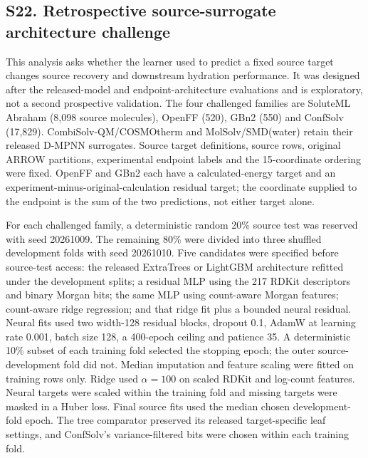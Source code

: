 \subsection*{S22. Retrospective source-surrogate architecture challenge}

This analysis asks whether the learner used to predict a fixed source target
changes source recovery and downstream hydration performance. It was designed
after the released-model and endpoint-architecture evaluations and is
exploratory, not a second prospective validation. The four challenged families
are SoluteML Abraham (8,098 source molecules), OpenFF (520), GBn2 (550) and
ConfSolv (17,829). CombiSolv-QM/COSMOtherm and MolSolv/SMD(water) retain their
released D-MPNN surrogates. Source target definitions, source rows, original
ARROW partitions, experimental endpoint labels and the 15-coordinate ordering
were fixed. OpenFF and GBn2 each have a calculated-energy target and an
experiment-minus-original-calculation residual target; the coordinate supplied
to the endpoint is the sum of the two predictions, not either target alone.

For each challenged family, a deterministic random 20\% source test was reserved
with seed 20261009. The remaining 80\% were divided into three shuffled
development folds with seed 20261010. Five candidates were specified before
source-test access: the released ExtraTrees or LightGBM architecture refitted
under the development splits; a residual MLP using the 217 RDKit descriptors
and binary Morgan bits; the same MLP using count-aware Morgan features;
count-aware ridge regression; and that ridge fit plus a bounded neural residual.
Neural fits used two width-128 residual blocks, dropout 0.1, AdamW at learning
rate 0.001, batch size 128, a 400-epoch ceiling and patience 35. A deterministic
10\% subset of each training fold selected the stopping epoch; the outer
source-development fold did not. Median imputation and feature scaling were
fitted on training rows only. Ridge used $\alpha=100$ on scaled RDKit and
log-count features. Neural targets were scaled within the training fold and
missing targets were masked in a Huber loss. Final source fits used the median
chosen development-fold epoch. The tree comparator preserved its released
target-specific leaf settings, and ConfSolv's variance-filtered bits were
chosen within each training fold.

